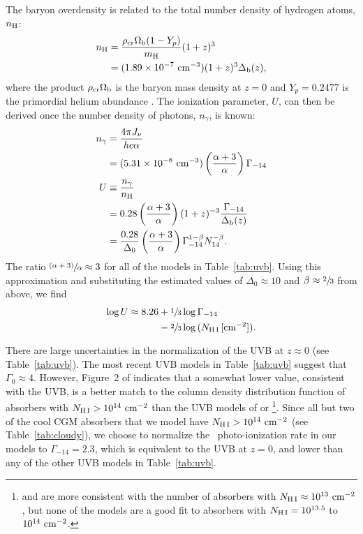 \documentclass[twocolumn,twocolappendix,tighten,times]{aastex6}
\newcommand{\HI}{\ion{H}{1}}
\begin{document}
The baryon overdensity is related to the total number density of hydrogen atoms, 
$n_{\rm H}$:
\begin{align}
n_{\rm H} &= \frac{\rho_{\rm cr}\Omega_{\rm b}(1-Y_p)}{m_{\rm H}}(1+z)^3 \\*
          &= (1.89\times10^{-7}~{\rm cm^{-3}}) (1+z)^3 \Delta_{\rm b}(z), \nonumber
\end{align}
where the product $\rho_{\rm cr}\Omega_{\rm b}$ is the baryon mass density at $z=0$ 
and $Y_p=0.2477$ is the primordial helium abundance \citep*{peimbert07}. The 
ionization parameter, $U$, can then be derived once the number density of 
photons, $n_{\gamma}$, is known:
\begin{align}
n_{\gamma} &= \frac{4\pi J_{\nu}}{hc\alpha} \\*
           &= (5.31\times10^{-8}~{\rm cm}^{-3}) \left(\frac{\alpha+3}{\alpha}\right)  \Gamma_{-14} \nonumber \\*
U &\equiv \frac{n_{\gamma}}{n_{\rm H}} \\*
  &= 0.28 \left(\frac{\alpha+3}{\alpha}\right) (1+z)^{-3} \frac{\Gamma_{-14}}{\Delta_{\rm b}(z)} \nonumber \\*
  &= \frac{0.28}{\Delta_0} \left(\frac{\alpha+3}{\alpha}\right) \Gamma_{-14}^{1-\beta} N_{14}^{-\beta}. \nonumber
\end{align}
The ratio $\sfrac{(\alpha+3)}{\alpha} \approx 3$ for all of the models in 
Table~\ref{tab:uvb}. Using this approximation and substituting the estimated values of 
$\Delta_0\approx10$ and $\beta\approx\sfrac{2}{3}$ from above, we find
\begin{align}
\label{eqn:logU}
\log{U} \approx 8.26 &+ \sfrac{1}{3} \log{\Gamma_{-14}} \\*
                     &- \sfrac{2}{3} \log{(N_{\rm H\,I}\,[{\rm cm}^{-2}])}. \nonumber
\end{align}

There are large uncertainties in the normalization of the UVB at $z\approx0$
(see Table~\ref{tab:uvb}). The most recent UVB models in Table~\ref{tab:uvb} 
suggest that $\Gamma_0\approx4$. However, Figure~2 of \citet{shull15} indicates 
that a somewhat lower value, consistent with the \citet{haardt12} UVB, is a better 
match to the column density distribution function of absorbers with 
$N_{\rm H\,I}>10^{14}~{\rm cm}^{-2}$ than the UVB models of \citet{haardt01} 
or \citet{haardt05}\footnote{\citet{haardt01} and \citet{haardt05} are more 
consistent with the number of absorbers with 
$N_{\rm H\,I}\approx10^{13}~{\rm cm}^{-2}$, but none of the \citeauthor{haardt01} 
models are a good fit to absorbers with $N_{\rm H\,I}=10^{13.5}$ to 
$10^{14}~{\rm cm}^{-2}$.}. Since all but two of the cool CGM absorbers that we 
model have $N_{\rm H\,I}>10^{14}~{\rm cm}^{-2}$ (see Table~\ref{tab:cloudy}), we  
choose to normalize the \HI\ photo-ionization rate in our models to 
$\Gamma_{-14}=2.3$, which is equivalent to the \citet{haardt12} UVB at $z=0$,
and lower than any of the other UVB models in Table~\ref{tab:uvb}. 
\end{document}
